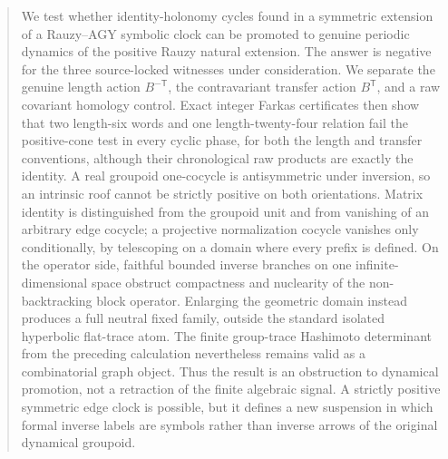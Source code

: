\begin{abstract}
We test whether identity-holonomy cycles found in a symmetric extension of a
Rauzy--AGY symbolic clock can be promoted to genuine periodic dynamics of the
positive Rauzy natural extension.  The answer is negative for the three
source-locked witnesses under consideration.  We separate the genuine length
action $B^{-\mathsf T}$, the contravariant transfer action $B^{\mathsf T}$,
and a raw covariant homology control.  Exact integer Farkas certificates then
show that two length-six words and one length-twenty-four relation fail the
positive-cone test in every cyclic phase, for both the length and transfer
conventions, although their chronological raw products are exactly the
identity.  A real groupoid one-cocycle is antisymmetric under inversion, so an
intrinsic roof cannot be strictly positive on both orientations.  Matrix
identity is distinguished from the groupoid unit and from vanishing of an
arbitrary edge cocycle; a projective normalization cocycle vanishes only
conditionally, by telescoping on a domain where every prefix is defined.  On
the operator side, faithful bounded inverse branches on one
infinite-dimensional space obstruct compactness and nuclearity of the
non-backtracking block operator.  Enlarging the geometric domain instead
produces a full neutral fixed family, outside the standard isolated
hyperbolic flat-trace atom.  The finite group-trace Hashimoto determinant from
the preceding calculation nevertheless remains valid as a combinatorial
graph object.  Thus the result is an obstruction to dynamical promotion, not
a retraction of the finite algebraic signal.  A strictly positive symmetric
edge clock is possible, but it defines a new suspension in which formal
inverse labels are symbols rather than inverse arrows of the original
dynamical groupoid.
\end{abstract}
